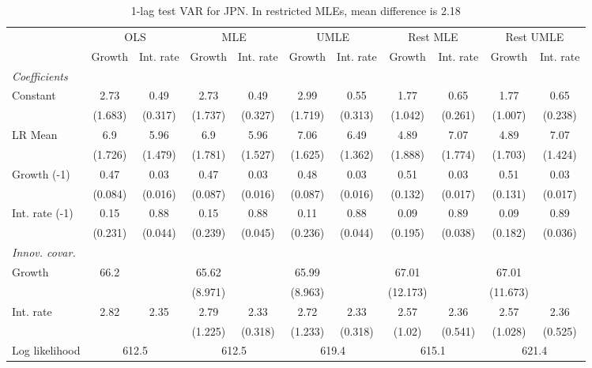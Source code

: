 \begin{table}[htbp] 
	\centering
	\begin{tabular}{@{\extracolsep{4pt}}lcccccccccc@{}}		\hline\hline
		 		 & \multicolumn{2}{c}{OLS} &\multicolumn{2}{c}{MLE} &\multicolumn{2}{c}{UMLE} &\multicolumn{2}{c}{Rest MLE} &\multicolumn{2}{c}{Rest UMLE} \\ 
 		 & Growth 	 & Int. rate 	 & Growth 	 & Int. rate 	 & Growth 	 & Int. rate 	 & Growth 	 & Int. rate 	 & Growth 	 & Int. rate\\\cline{2-3}\cline{4-5}\cline{6-7}\cline{8-9}\cline{10-11}
\rule{0pt}{4ex} 
 \emph{Coefficients} 	  		 & 		 & 		 & 		 & 		 & 		 & 		 & 		 & 		 & 		 &\\ 
\quad Constant 	 & 2.73 	 & 0.49 	 & 2.73 	 & 0.49 	 & 2.99 	 & 0.55 	 & 1.77 	 & 0.65 	 & 1.77 	 & 0.65	 \\ 
 		 & (1.683) 	 & (0.317) 	 & (1.737) 	 & (0.327) 	 & (1.719) 	 & (0.313) 	 & (1.042) 	 & (0.261) 	 & (1.007) 	 & (0.238) 	 \\ 
\quad LR Mean 	 & 6.9 	 & 5.96 	 & 6.9 	 & 5.96 	 & 7.06 	 & 6.49 	 & 4.89 	 & 7.07 	 & 4.89 	 & 7.07	 \\ 
 		 & (1.726) 	 & (1.479) 	 & (1.781) 	 & (1.527) 	 & (1.625) 	 & (1.362) 	 & (1.888) 	 & (1.774) 	 & (1.703) 	 & (1.424) 	 \\ 
\quad Growth (-1) 	 &0.47 	 & 0.03 	 & 0.47 	 & 0.03 	 & 0.48 	 & 0.03 	 & 0.51 	 & 0.03 	 & 0.51 	 & 0.03	 \\ 
 		 & (0.084) 	 & (0.016) 	 & (0.087) 	 & (0.016) 	 & (0.087) 	 & (0.016) 	 & (0.132) 	 & (0.017) 	 & (0.131) 	 & (0.017) 	 \\ 
\quad Int. rate (-1) 	 &0.15 	 & 0.88 	 & 0.15 	 & 0.88 	 & 0.11 	 & 0.88 	 & 0.09 	 & 0.89 	 & 0.09 	 & 0.89	 \\ 
 		 & (0.231) 	 & (0.044) 	 & (0.239) 	 & (0.045) 	 & (0.236) 	 & (0.044) 	 & (0.195) 	 & (0.038) 	 & (0.182) 	 & (0.036) 	 \\ 
\rule{0pt}{4ex} \emph{Innov. covar.}  	 & 	 & 	 & 	 & 	 & 	 & 	 & 	 & 	 & 	 &\\ 
\quad Growth 	 &66.2 	 &  	 & 65.62 	 &  	 & 65.99 	 &  	 & 67.01 	 &  	 & 67.01 	 & 	 \\ 
 		 &  	 &  	 & (8.971) 	 &  	 & (8.963) 	 &  	 & (12.173) 	 &  	 & (11.673) 	 &  	 \\ 
\quad Int. rate 	 &2.82 	 & 2.35 	 & 2.79 	 & 2.33 	 & 2.72 	 & 2.33 	 & 2.57 	 & 2.36 	 & 2.57 	 & 2.36	 \\ 
 		 &  	 &  	 & (1.225) 	 & (0.318) 	 & (1.233) 	 & (0.318) 	 & (1.02) 	 & (0.541) 	 & (1.028) 	 & (0.525) 	 \\ 
 \hline \rule{0pt}{4ex} 
  Log likelihood 	 &\multicolumn{2}{c}{612.5} 	 & \multicolumn{2}{c}{612.5} 	 & \multicolumn{2}{c}{619.4} 	 & \multicolumn{2}{c}{615.1} 	 & \multicolumn{2}{c}{621.4}\\ 

 \hline 	\end{tabular}		\caption{1-lag test VAR for JPN. In restricted MLEs, mean difference is 2.18}
		\label{tab:JPN1}

\end{table}